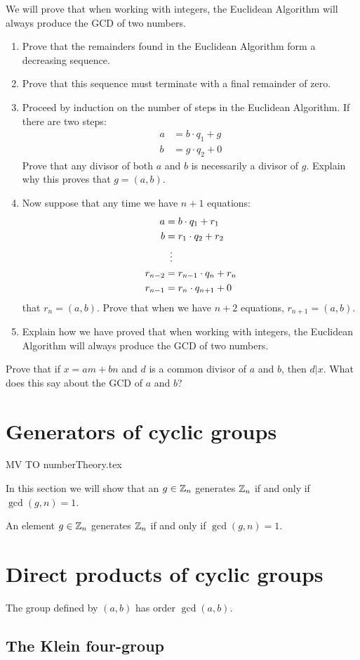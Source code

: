 \documentclass{ximera}
\begin{document}
\begin{exercise} 
We will prove that when working with integers, the Euclidean Algorithm
will always produce the GCD of two numbers.
\begin{enumerate}
\item Prove that the remainders found in the Euclidean Algorithm form a
  decreasing sequence.
\item Prove that this sequence must terminate with a final remainder
  of zero.
\item Proceed by induction on the number of steps in the Euclidean
  Algorithm. If there are two steps:
\begin{align*}
a &= b\cdot q_1 + g \\
b &= g\cdot q_2 +0
\end{align*}
Prove that any divisor of both $a$ and $b$ is necessarily a divisor
of $g$. Explain why this proves that $g = (a,b)$.
\item Now suppose that any time we have $n+1$ equations:
\begin{align*}
a &= b\cdot q_1 + r_1 \\
b &= r_1\cdot q_2 + r_2 \\
  &\hspace{.5em}\vdots\\
r_{n-2} &= r_{n-1}\cdot q_{n} + r_n\\
r_{n-1} &= r_{n}\cdot q_{n+1} + 0
\end{align*}
that $r_n = (a,b)$. Prove that when we have $n+2$ equations, $r_{n+1}
= (a,b)$.
\item Explain how we have proved that when working with integers, the
  Euclidean Algorithm will always produce the GCD of two numbers.
\end{enumerate}
\end{exercise}


\begin{exercise} 
Prove that if $x = am +bn$ and $d$ is a common divisor of $a$ and $b$,
then $d|x$. What does this say about the GCD of $a$ and $b$?
\end{exercise}



\section{Generators of cyclic groups}


MV TO numberTheory.tex




In this section we will show that an $g\in \mathbb Z_n$ generates $\mathbb Z_n$ if
and only if $\gcd(g,n) = 1$.




\begin{theorem}
  An element $g\in \mathbb Z_n$ generates $\mathbb Z_n$ if and only if $\gcd(g,n) =
  1$.
\end{theorem}










\section{Direct products of cyclic groups}

The group defined by $(a,b)$ has order $\gcd(a,b)$.

\subsection{The Klein four-group}
\end{document}
